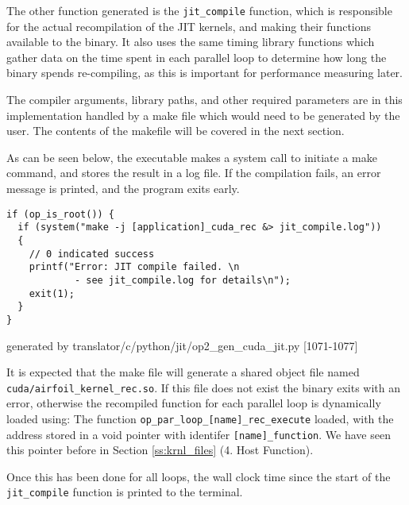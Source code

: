 {
The other function generated is the \verb|jit_compile| function, which is responsible for the actual recompilation of the JIT kernels, and making their functions available to the binary. It also uses the same timing library functions which gather data on the time spent in each parallel loop to determine how long the binary spends re-compiling, as this is important for performance measuring later.
\par
The compiler arguments, library paths, and other required parameters are in this implementation handled by a make file which would need to be generated by the user. The contents of the makefile will be covered in the next section.
\par
As can be seen below, the executable makes a system call to initiate a make command, and stores the result in a log file. If the compilation fails, an error message is printed, and the program exits early.
\begin{lstlisting}[linewidth = \textwidth, framesep=0pt]
if (op_is_root()) {
  if (system("make -j [application]_cuda_rec &> jit_compile.log"))
  {
    // 0 indicated success
    printf("Error: JIT compile failed. \n
            - see jit_compile.log for details\n");
    exit(1);
  }
}
\end{lstlisting}
\vspace{-1em}
\hspace*{\fill}\footnotesize{generated by translator/c/python/jit/op2\_gen\_cuda\_jit.py [1071-1077]}

It is expected that the make file will generate a shared object file named \verb|cuda/airfoil_kernel_rec.so|. If this file does not exist the binary exits with an error, otherwise the recompiled function for each parallel loop is dynamically loaded using:
The function \verb|op_par_loop_[name]_rec_execute| loaded, with the address stored in a void pointer with identifer \verb|[name]_function|. We have seen this pointer before in Section \ref{ss:krnl_files} (4. Host Function).
\par
Once this has been done for all loops, the wall clock time since the start of the \verb|jit_compile| function is printed to the terminal.

}
